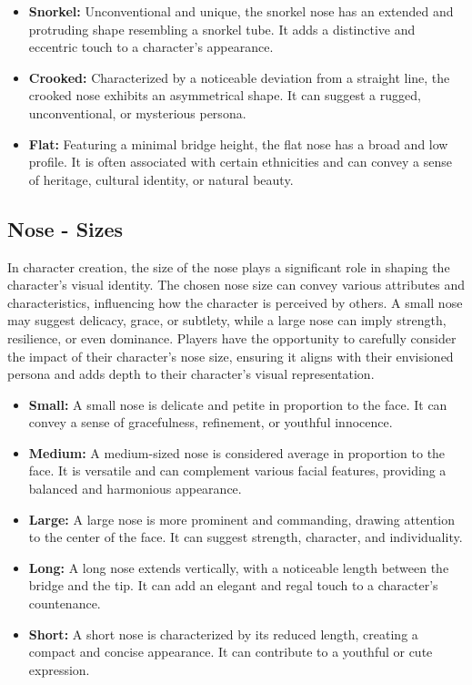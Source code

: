 \documentclass[12pt]{book}  %
\begin{document}
\begin{itemize}
    \item \textbf{Snorkel:} Unconventional and unique, the snorkel nose has an extended and protruding shape resembling a snorkel tube. It adds a distinctive and eccentric touch to a character's appearance.

    \item \textbf{Crooked:} Characterized by a noticeable deviation from a straight line, the crooked nose exhibits an asymmetrical shape. It can suggest a rugged, unconventional, or mysterious persona.

    \item \textbf{Flat:} Featuring a minimal bridge height, the flat nose has a broad and low profile. It is often associated with certain ethnicities and can convey a sense of heritage, cultural identity, or natural beauty.
\end{itemize}

\subsection{\textbf{Nose - Sizes}}

In character creation, the size of the nose plays a significant role in shaping the character's visual identity. The chosen nose size can convey various attributes and characteristics, influencing how the character is perceived by others. A small nose may suggest delicacy, grace, or subtlety, while a large nose can imply strength, resilience, or even dominance. Players have the opportunity to carefully consider the impact of their character's nose size, ensuring it aligns with their envisioned persona and adds depth to their character's visual representation.

\begin{itemize}
    \item \textbf{Small:} A small nose is delicate and petite in proportion to the face. It can convey a sense of gracefulness, refinement, or youthful innocence.

    \item \textbf{Medium:} A medium-sized nose is considered average in proportion to the face. It is versatile and can complement various facial features, providing a balanced and harmonious appearance.

    \item \textbf{Large:} A large nose is more prominent and commanding, drawing attention to the center of the face. It can suggest strength, character, and individuality.

    \item \textbf{Long:} A long nose extends vertically, with a noticeable length between the bridge and the tip. It can add an elegant and regal touch to a character's countenance.

    \item \textbf{Short:} A short nose is characterized by its reduced length, creating a compact and concise appearance. It can contribute to a youthful or cute expression.
\end{itemize}
\end{document}
